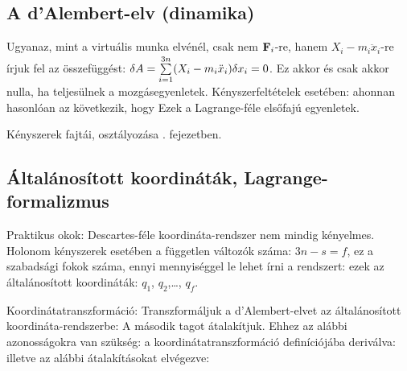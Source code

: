   \subsection{A d'Alembert-elv (dinamika)}\label{ss1:dalembert}
   
   Ugyanaz, mint a virtuális munka elvénél, csak nem $\mathbf{F}_i$-re, hanem $X_i-m_i\ddot{x}_i$-re írjuk fel az összefüggést: $\delta A = \sum\limits_{i=1}^{3n}(X_i-m_i\ddot{x}_i)\delta x_i=0$. Ez akkor és csak akkor nulla, ha teljesülnek a mozgásegyenletek. Kényszerfeltételek esetében:
   ahonnan hasonlóan az következik, hogy 
   Ezek a Lagrange-féle elsőfajú egyenletek. 
   
   Kényszerek fajtái, osztályozása . fejezetben.
   
   
  \subsection{Általánosított koordináták, Lagrange-formalizmus}\label{ss1:lagrange2}
   
   Praktikus okok: Descartes-féle koordináta-rendszer nem mindig kényelmes. Holonom kényszerek esetében a független változók száma: $3n-s=f$, ez a szabadsági fokok száma, ennyi mennyiséggel le lehet írni a rendszert: ezek az általánosított koordináták: $q_1$, $q_2$,\dots, $q_f$. 
   
   Koordinátatranszformáció:
   Transzformáljuk a d'Alembert-elvet az általánosított koordináta-rendszerbe:
   A második tagot átalakítjuk. Ehhez az alábbi azonosságokra van szükség: a koordinátatranszformáció definíciójába deriválva:
   illetve az alábbi átalakításokat elvégezve:
   
